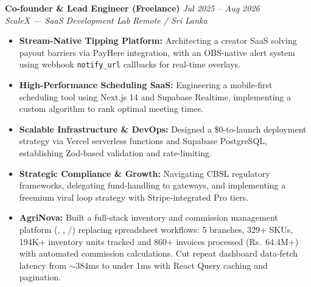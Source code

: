 \noindent
\textbf{Co-founder \& Lead Engineer (Freelance)} \hfill \textit{Jul 2025 -- Aug 2026}\\
\textit{ScaleX --- SaaS Development Lab} \hfill \textit{Remote / Sri Lanka}\\[0.05em]
\begin{itemize}[leftmargin=*, itemsep=0.1em, topsep=0.1em]
    \item \textbf{Stream-Native Tipping Platform:} Architecting a creator SaaS solving payout barriers via PayHere integration, with an OBS-native alert system using webhook \texttt{notify\_url} callbacks for real-time overlays.
    \item \textbf{High-Performance Scheduling SaaS:} Engineering a mobile-first scheduling tool using Next.js 14 and Supabase Realtime, implementing a custom algorithm to rank optimal meeting times.
    \item \textbf{Scalable Infrastructure \& DevOps:} Designed a \$0-to-launch deployment strategy via Vercel serverless functions and Supabase PostgreSQL, establishing Zod-based validation and rate-limiting.
    \item \textbf{Strategic Compliance \& Growth:} Navigating CBSL regulatory frameworks, delegating fund-handling to gateways, and implementing a freemium viral loop strategy with Stripe-integrated Pro tiers.
    \item \textbf{AgriNova:} Built a full-stack inventory and commission management platform (, , /\allowbreak{}) replacing spreadsheet workflows: 5 branches, 329+ SKUs, 194K+ inventory units tracked and 860+ invoices processed (Rs.~64.4M+) with automated commission calculations. Cut repeat dashboard data-fetch latency from $\sim$384ms to under 1ms with React Query caching and pagination.
\end{itemize}
